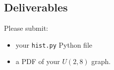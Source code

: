 \begin{fullwidth}
\section{Deliverables}

Please submit:

\begin{itemize}
\item your {\tt hist.py} Python file
\item a PDF of your $U(2,8)$ graph.
\end{itemize}

\end{fullwidth}

